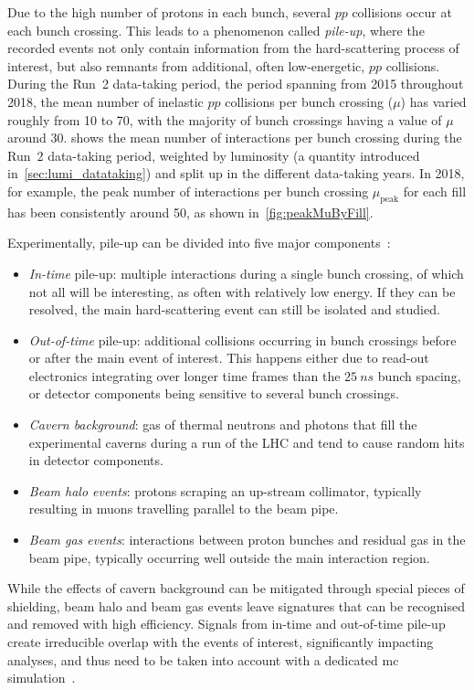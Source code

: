 Due to the high number of protons in each bunch, several $pp$ collisions occur at each bunch crossing.
This leads to a phenomenon called \textit{pile-up}, where the recorded events not only contain information from the hard-scattering process of interest, but also remnants from additional, often low-energetic, $pp$ collisions.
During the Run~2 data-taking period, \ie the period spanning from 2015 throughout 2018, the mean number of inelastic $pp$ collisions per bunch crossing ($\mu$) has varied roughly from 10 to 70, with the majority of bunch crossings having a value of $\mu$ around 30.
 shows the mean number of interactions per bunch crossing during the Run~2 data-taking period, weighted by luminosity (a quantity introduced in~\cref{sec:lumi_datataking}) and split up in the different data-taking years. In 2018, for example, the peak number of interactions per bunch crossing $\mu_\mathrm{peak}$ for each fill has been consistently around 50, as shown in~\cref{fig:peakMuByFill}.

Experimentally, pile-up can be divided into five major components~\cite{Marshall:2014mza}:
\begin{itemize}
	\item \textit{In-time} pile-up: multiple interactions during a single bunch crossing, of which not all will be interesting, as often with relatively low energy. If they can be resolved, the main hard-scattering event can still be isolated and studied.
	\item \textit{Out-of-time} pile-up: additional collisions occurring in bunch crossings before or after the main event of interest. This happens either due to read-out electronics integrating over longer time frames than the $\SI{25}{ns}$ bunch spacing, or detector components being sensitive to several bunch crossings.
	\item \textit{Cavern background}: gas of thermal neutrons and photons that fill the experimental caverns during a run of the LHC and tend to cause random hits in detector components.
	\item \textit{Beam halo events}: protons scraping an up-stream collimator, typically resulting in muons travelling parallel to the beam pipe.
	\item \textit{Beam gas events}: interactions between proton bunches and residual gas in the beam pipe, typically occurring well outside the main interaction region.
\end{itemize}
While the effects of cavern background can be mitigated through special pieces of shielding, beam halo and beam gas events leave signatures that can be recognised and removed with high efficiency. Signals from in-time and out-of-time pile-up create irreducible overlap with the events of interest, significantly impacting analyses, and thus need to be taken into account with a dedicated \gls{mc} simulation~\cite{Marshall:2014mza}.

